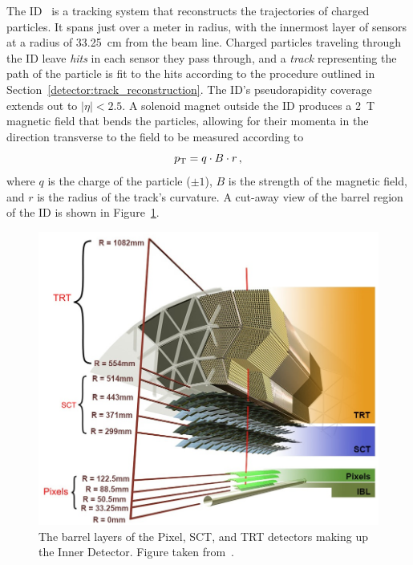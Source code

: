 ﻿The ID~\cite{1997.id-tdr-1, 1997.id-tdr-2} is a tracking system that reconstructs the trajectories of charged particles.
It spans just over a meter in radius, with the innermost layer of sensors at a radius of 33.25~cm from the beam line.
Charged particles traveling through the ID leave \emph{hits} in each sensor they pass through, and a \emph{track} representing the path of the particle is fit to the hits according to the procedure outlined in Section~\ref{detector:track_reconstruction}.
The ID's pseudorapidity coverage extends out to $|\eta| < 2.5$.
A solenoid magnet outside the ID produces a 2~T magnetic field that bends the particles, allowing for their momenta in the direction transverse to the field to be measured according to
\begin{equation}
  \pt = q\cdot B\cdot r\,,
  \label{eq:id_pt}
\end{equation}
where $q$ is the charge of the particle ($\pm 1$), $B$ is the strength of the magnetic field, and $r$ is the radius of the track's curvature.
A cut-away view of the barrel region of the ID is shown in Figure~\ref{fig:detector_ID}.

\begin{figure}
  \centering
  \includegraphics[width=.7\textwidth]{figs/detector/ID2}
  \caption[The barrel layers of the Pixel, SCT, and TRT detectors making up the Inner Detector.]{The barrel layers of the Pixel, SCT, and TRT detectors making up the Inner Detector.  Figure taken from~\cite{2015.track-reconstruction-performance-13tev}.}
  \label{fig:detector_ID}
\end{figure}


